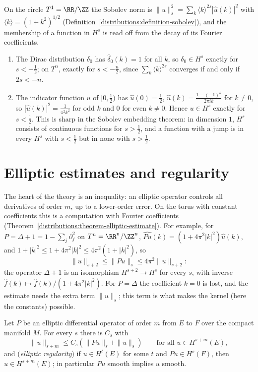 \begin{example}\label{elliptic-operators:example-sobolev-circle}
On the circle $T^1 = \RR/\ZZ$ the Sobolev norm is $\|u\|_s^2 = \sum_k\langle k\rangle^{2s}|\hat u(k)|^2$ with $\langle k\rangle = (1 + k^2)^{1/2}$ (Definition~\ref{distributions:definition-sobolev}), and the
membership of a function in $H^s$ is read off from the decay of its Fourier coefficients.
\begin{enumerate}
\item The Dirac distribution $\delta_0$ has $\hat\delta_0(k) = 1$ for all $k$, so $\delta_0 \in H^s$ exactly for $s < -\frac12$; on $T^n$, exactly for $s < -\frac n2$, since $\sum_k\langle k\rangle^{2s}$ converges
if and only if $2s < -n$.
\item The indicator function $u$ of $[0, \frac12)$ has $\hat u(0) = \frac12$, $\hat u(k) = \frac{1 - (-1)^k}{2\pi ik}$ for $k \neq 0$, so $|\hat u(k)|^2 = \frac{1}{\pi^2k^2}$ for odd $k$ and $0$ for even $k \neq 0$.
Hence $u \in H^s$ exactly for $s < \frac12$. This is sharp in the Sobolev embedding theorem: in dimension $1$, $H^s$ consists of continuous functions for $s > \frac12$, and a function with a jump is in
every $H^s$ with $s < \frac12$ but in none with $s > \frac12$.
\end{enumerate}
\end{example}

\section{Elliptic estimates and regularity}\label{elliptic-operators:section-estimates}

The heart of the theory is an inequality: an elliptic operator controls all derivatives of order $m$, up to a lower-order error. On the torus with constant coefficients this is a computation with
Fourier coefficients (Theorem~\ref{distributions:theorem-elliptic-estimate}). For example, for $P = \Delta + 1 = 1 - \sum_j\partial_j^2$ on $T^n = \RR^n/\ZZ^n$, $\widehat{Pu}(k) = (1 + 4\pi^2|k|^2)\hat u(k)$, and
$1 + |k|^2 \leq 1 + 4\pi^2|k|^2 \leq 4\pi^2(1 + |k|^2)$, so
\[
\|u\|_{s+2} \leq \|Pu\|_s \leq 4\pi^2\|u\|_{s+2}:
\]
the operator $\Delta + 1$ is an isomorphism $H^{s+2} \to H^s$ for every $s$, with inverse $\hat f(k) \mapsto \hat f(k)/(1 + 4\pi^2|k|^2)$. For $P = \Delta$ the coefficient $k = 0$ is lost, and the estimate needs the
extra term $\|u\|_s$; this term is what makes the kernel (here the constants) possible.

\begin{theorem}\label{elliptic-operators:theorem-elliptic-estimate}
Let $P$ be an elliptic differential operator of order $m$ from $E$ to $F$ over the compact manifold $M$. For every $s$ there is $C_s$ with
\[
\|u\|_{s+m} \leq C_s\left(\|Pu\|_s + \|u\|_s\right) \qquad \text{for all } u \in H^{s+m}(E),
\]
and (\emph{elliptic regularity}) if $u \in H^t(E)$ for some $t$ and $Pu \in H^s(F)$, then $u \in H^{s+m}(E)$; in particular $Pu$ smooth implies $u$ smooth.
\end{theorem}

